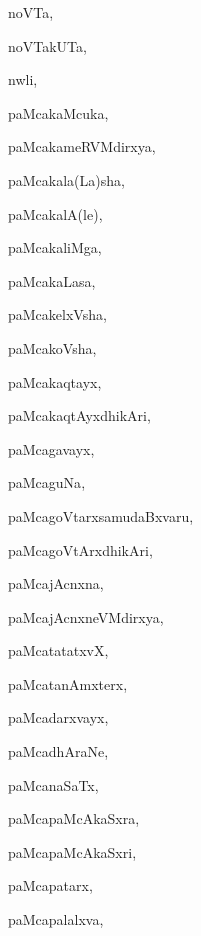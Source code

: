 \begin{multicols}{3}
{\noindent
{noVTa}, \pageref{noVTa}

\noindent
{noVTakUTa}, \pageref{noVTakUTa}

\noindent
{nwli}, \pageref{nwli}

\bigskip
\noindent
{}
\smallskip

\noindent
{paMcakaMcuka}, \pageref{paMcakaMcuka}

\noindent
{paMcakameRVMdirxya}, \pageref{paMcakameRVMdirxya}

\noindent
{paMcakala(La)sha}, \pageref{paMcakalaLasha}

\noindent
{paMcakalA(le)}, \pageref{paMcakalAle}

\noindent
{paMcakaliMga}, \pageref{paMcakaliMga}

\noindent
{paMcakaLasa}, \pageref{paMcakaLasa}

\noindent
{paMcakelxVsha}, \pageref{paMcakelxVsha}

\noindent
{paMcakoVsha}, \pageref{paMcakoVsha}

\noindent
{paMcakaqtayx}, \pageref{paMcakaqtayx}

\noindent
{paMcakaqtAyxdhikAri}, \pageref{paMcakaqtAyxdhikAri}

\noindent
{paMcagavayx}, \pageref{paMcagavayx}

\noindent
{paMcaguNa}, \pageref{paMcaguNa}

\noindent
{paMcagoVtarxsamudaBxvaru}, \pageref{paMcagoVtarxsamudaBxvaru}

\noindent
{paMcagoVtArxdhikAri}, \pageref{paMcagoVtArxdhikAri}

\noindent
{paMcajAcnxna}, \pageref{paMcajAcnxna}

\noindent
{paMcajAcnxneVMdirxya}, \pageref{paMcajAcnxneVMdirxya}

\noindent
{paMcatatatxvX}, \pageref{paMcatatatxvX}

\noindent
{paMcatanAmxterx}, \pageref{paMcatanAmxterx}

\noindent
{paMcadarxvayx}, \pageref{paMcadarxvayx}

\noindent
{paMcadhAraNe}, \pageref{paMcadhAraNe}

\noindent
{paMcanaSaTx}, \pageref{paMcanaSaTx}

\noindent
{paMcapaMcAkaSxra}, \pageref{paMcapaMcAkaSxra}

\noindent
{paMcapaMcAkaSxri}, \pageref{paMcapaMcAkaSxri}

\noindent
{paMcapatarx}, \pageref{paMcapatarx}

\noindent
{paMcapalalxva}, \pageref{paMcapalalxva}

}
\end{multicols}
